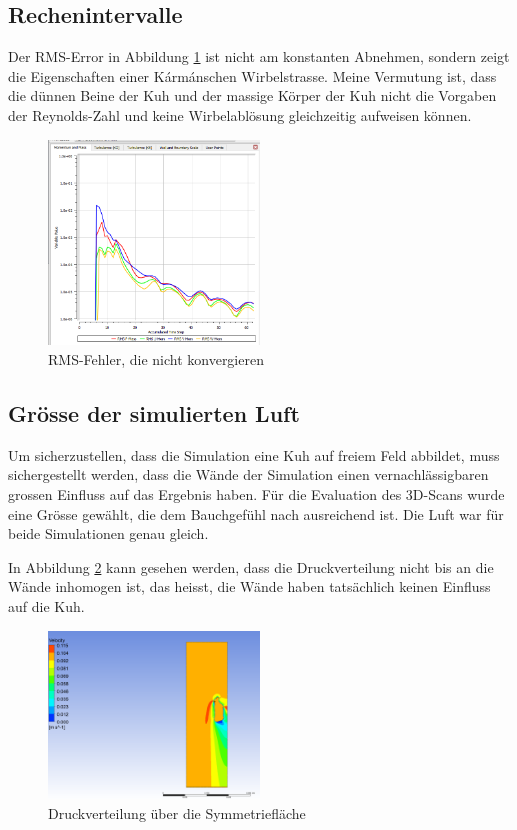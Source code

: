 \documentclass[a4paper,12pt]{article}
\begin{document}
\subsection{Rechenintervalle}
Der RMS-Error in Abbildung \ref{fig:monitor1} ist nicht am konstanten Abnehmen, sondern zeigt die Eigenschaften einer Kármánschen Wirbelstrasse. Meine Vermutung ist, dass die dünnen Beine der Kuh und der massige Körper der Kuh nicht die Vorgaben der Reynolds-Zahl und keine Wirbelablösung gleichzeitig aufweisen können.

\begin{figure}[h]
    \centering
    \includegraphics[width=0.5\textwidth]{rms.PNG}
    \caption{RMS-Fehler, die nicht konvergieren}
    \label{fig:monitor1}
\end{figure}

\subsection{Grösse der simulierten Luft}
Um sicherzustellen, dass die Simulation eine Kuh auf freiem Feld abbildet, muss sichergestellt werden, dass die Wände der Simulation einen vernachlässigbaren grossen Einfluss auf das Ergebnis haben. Für die Evaluation des 3D-Scans wurde eine Grösse gewählt, die dem Bauchgefühl nach ausreichend ist. Die Luft war für beide Simulationen genau gleich.

In Abbildung \ref{fig:p} kann gesehen werden, dass die Druckverteilung nicht bis an die Wände inhomogen ist, das heisst, die Wände haben tatsächlich keinen Einfluss auf die Kuh.

\begin{figure}[h]
    \centering
    \includegraphics[width=0.5\textwidth]{Unbenannt.PNG}
    \caption{Druckverteilung über die Symmetriefläche}
    \label{fig:p}
\end{figure}
\end{document}
